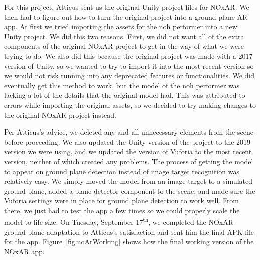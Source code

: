 \documentclass[a4paper, 10pt, american, titlepage]{article}
\begin{document}
For this project, Atticus sent us the original Unity project files for NOxAR.
We then had to figure out how to turn the original project into a ground plane
AR app. At first we tried importing the assets for the noh performer into a new
Unity project. We did this two reasons. First,
we did not want all of the extra components of the original NOxAR project to
get in the way of what we were trying to do. We also did this because the
original project was made with a 2017 version of Unity, so we wanted to try to
import it into the most recent version so we would not risk running into any
deprecated features or functionalities. We did eventually get this method to
work, but the model of the noh performer was lacking a lot of the details that
the original model had. This was attributed to errors while importing the
original assets, so we decided to try making changes to the original NOxAR
project instead. 

Per Atticus's advice, we deleted any and all unnecessary elements from the scene
before proceeding. We also updated the Unity version of the project to the 2019
version we were using, and we updated the version of Vuforia to the most recent
version, neither of which created any problems. The process of getting the model
to appear on ground plane detection instead of image target recognition was
relatively easy. We simply moved the model from an image target to a simulated
ground plane, added a plane detector component to the scene, and made sure the
Vuforia settings were in place for ground plane detection to work well. From
there, we just had to test the app a few times so we could properly scale the
model to life size. On Tuesday, September 17\textsuperscript{th}, we completed
the NOxAR ground plane adaptation to Atticus's satisfaction and sent him the
final APK file for the app. Figure~\ref{fig:noArWorking} shows how the final
working version of the NOxAR app.
\end{document}
